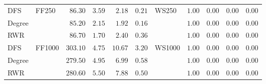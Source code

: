 \begin{table}
{\begin{tabular}{
        |l||
        l|
        r
        r|
        r
        r||
        l|
        r
        r|
        r
        r|
      }
      \hline
      DFS    & \multirow{3}{*}{ FF250 }  & $\mathbf{86.30}$                 & $\mathbf{3.59}$                  & $2.18$          & $0.21$                           & \multirow{3}{*}{ WS250 }        & $1.00$            & $0.00$          & $0.00$              & $0.00$           \\
      Degree &                           & $85.20$                          & $2.15$                           & $\mathbf{1.92}$ & $\mathbf{0.16}$                  &                                 & $1.00$            & $0.00$          & $0.00$              & $0.00$           \\
      RWR    &                           & $\mathbf{86.70}$                 & $\mathbf{1.70}$                  & $2.40$          & $0.36$                           &                                 & $1.00$            & $0.00$          & $0.00$              & $0.00$           \\
      \hline
      DFS    & \multirow{3}{*}{ FF1000 } & $\mathbf{303.10}$                & $\mathbf{4.75}$                  & $10.67$         & $3.20$                           & \multirow{3}{*}{ WS1000 }       & $1.00$            & $0.00$          & $0.00$              & $0.00$           \\
      Degree &                           & $279.50$                         & $4.95$                           & $6.99$          & $0.58$                           &                                 & $1.00$            & $0.00$          & $0.00$              & $0.00$           \\
      RWR    &                           & $280.60$                         & $5.50$                           & $\mathbf{7.88}$ & $\mathbf{0.50}$                  &                                 & $1.00$            & $0.00$          & $0.00$              & $0.00$           \\
      \hline
    \end{tabular}%
  }
\end{table}

